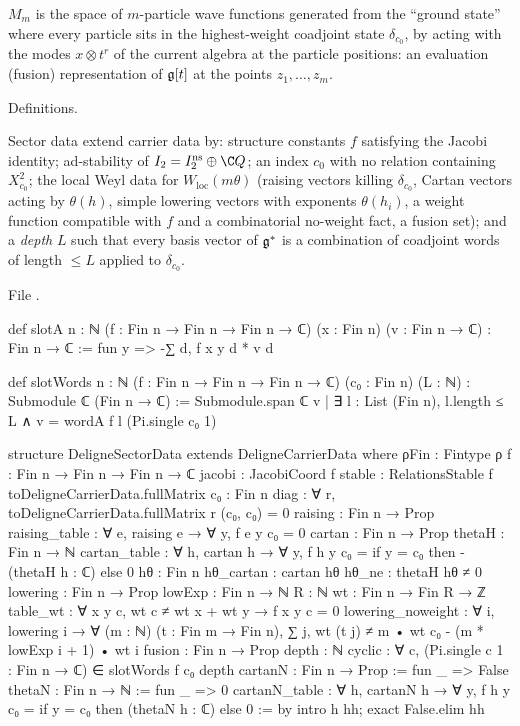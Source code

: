 \begin{physics}
$M_m$ is the space of $m$-particle wave functions generated from the ``ground state'' where every particle sits in
the highest-weight coadjoint state $\delta_{c_0}$, by acting with the modes $x\otimes t^r$ of the current algebra at the particle positions:
an evaluation (fusion) representation of $\mathfrak g[t]$ at the points $z_1,\dots,z_m$.
\end{physics}

\begin{status}
Definitions.
\end{status}

\begin{definition}\label{l24:def:sectordata}
Sector data extend carrier data by: structure constants $f$ satisfying the Jacobi identity; ad-stability of
$I_2=\ltwentyfourIns\oplus\C Q$; an index $c_0$ with no relation containing $X_{c_0}^2$; the local Weyl data for
$W_{\mathrm{loc}}(m\theta)$ (raising vectors killing $\delta_{c_0}$, Cartan vectors acting by $\theta(h)$, simple
lowering vectors with exponents $\theta(h_i)$, a weight function compatible with $f$ and a combinatorial
no-weight fact, a fusion set); and a \emph{depth} $L$ such that every basis vector of $\mathfrak g^*$ is a
combination of coadjoint words of length $\le L$ applied to $\delta_{c_0}$.
\end{definition}
\noindent File .
\begin{leancode}
def slotA {n : ℕ} (f : Fin n → Fin n → Fin n → ℂ) (x : Fin n) (v : Fin n → ℂ) : Fin n → ℂ :=
  fun y => -∑ d, f x y d * v d

def slotWords {n : ℕ} (f : Fin n → Fin n → Fin n → ℂ) (c₀ : Fin n) (L : ℕ) :
    Submodule ℂ (Fin n → ℂ) :=
  Submodule.span ℂ {v | ∃ l : List (Fin n), l.length ≤ L ∧ v = wordA f l (Pi.single c₀ 1)}

structure DeligneSectorData extends DeligneCarrierData where
  ρFin : Fintype ρ
  f : Fin n → Fin n → Fin n → ℂ
  jacobi : JacobiCoord f
  stable : RelationsStable f toDeligneCarrierData.fullMatrix
  c₀ : Fin n
  diag : ∀ r, toDeligneCarrierData.fullMatrix r (c₀, c₀) = 0
  raising : Fin n → Prop
  raising_table : ∀ e, raising e → ∀ y, f e y c₀ = 0
  cartan : Fin n → Prop
  thetaH : Fin n → ℕ
  cartan_table : ∀ h, cartan h → ∀ y, f h y c₀ = if y = c₀ then -(thetaH h : ℂ) else 0
  hθ : Fin n
  hθ_cartan : cartan hθ
  hθ_ne : thetaH hθ ≠ 0
  lowering : Fin n → Prop
  lowExp : Fin n → ℕ
  R : ℕ
  wt : Fin n → Fin R → ℤ
  table_wt : ∀ x y c, wt c ≠ wt x + wt y → f x y c = 0
  lowering_noweight : ∀ i, lowering i → ∀ (m : ℕ) (t : Fin m → Fin n),
    ∑ j, wt (t j) ≠ m • wt c₀ - (m * lowExp i + 1) • wt i
  fusion : Fin n → Prop
  depth : ℕ
  cyclic : ∀ c, (Pi.single c 1 : Fin n → ℂ) ∈ slotWords f c₀ depth
  cartanN : Fin n → Prop := fun _ => False
  thetaN : Fin n → ℕ := fun _ => 0
  cartanN_table : ∀ h, cartanN h → ∀ y, f h y c₀ = if y = c₀ then (thetaN h : ℂ) else 0 := by
    intro h hh; exact False.elim hh
\end{leancode}
